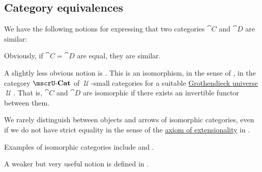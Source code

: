 \subsection{Category equivalences}\label{subsec:category_equivalences}

\begin{remark}\label{rem:category_similarity}
  We have the following notions for expressing that two categories \( \cat{C} \) and \( \cat{D} \) are similar:

  \begin{thmenum}
     Obviously, if \( \cat{C} = \cat{D} \) are equal, they are similar.

     A slightly less obvious notion is . This is an isomorphism, in the sense of , in the category \hyperref[def:category_of_small_categories]{\( \ucat{Cat} \)} of \( \mscrU \)-small categories for a suitable \hyperref[def:grothendieck_universe]{Grothendieck universe} \( \mscrU \). That is, \( \cat{C} \) and \( \cat{D} \) are isomorphic if there exists an invertible functor between them.

    We rarely distinguish between objects and arrows of isomorphic categories, even if we do not have strict equality in the sense of the \hyperref[def:zfc/extensionality]{axiom of extensionality} in \hyperref[def:zfc]{}.

    Examples of isomorphic categories include  and .

     A weaker but very useful notion is  defined in .
  \end{thmenum}
\end{remark}

